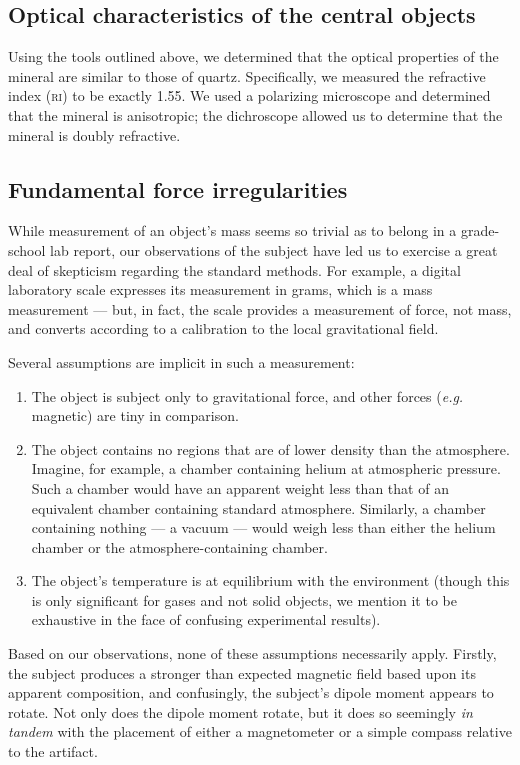 \documentclass[10pt]{article}
\begin{document}
\subsection{Optical characteristics of the central objects}
Using the tools outlined above, we determined that the optical properties of the mineral are similar to those of quartz.
Specifically, we measured the refractive index (\textsc{ri}) to be exactly 1.55.
We used a polarizing microscope and determined that the mineral is anisotropic; the dichroscope allowed us to determine that the mineral is doubly refractive.

\subsection{Fundamental force irregularities}
While measurement of an object's mass seems so trivial as to belong in a grade-school lab report, our observations of the subject have led us to exercise a great deal of skepticism regarding the standard methods.
For example, a digital laboratory scale expresses its measurement in grams, which is a mass measurement --- but, in fact, the scale provides a measurement of force, not mass, and converts according to a calibration to the local gravitational field.

Several assumptions are implicit in such a measurement:
\begin{enumerate}
\item The object is subject only to gravitational force, and other forces (\textit{e.g.} magnetic) are tiny in comparison.
\item The object contains no regions that are of lower density than the atmosphere. Imagine, for example, a chamber containing helium at atmospheric pressure. Such a chamber would have an apparent weight less than that of an equivalent chamber containing standard atmosphere. Similarly, a chamber containing nothing --- a vacuum --- would weigh less than either the helium chamber or the atmosphere-containing chamber.
\item The object's temperature is at equilibrium with the environment (though this is only significant for gases and not solid objects, we mention it to be exhaustive in the face of confusing experimental results).
\end{enumerate}

Based on our observations, none of these assumptions necessarily apply.
Firstly, the subject produces a stronger than expected magnetic field based upon its apparent composition, and confusingly, the subject's dipole moment appears to rotate.
Not only does the dipole moment rotate, but it does so seemingly \textit{in tandem} with the placement of either a magnetometer or a simple compass relative to the artifact.
\end{document}
